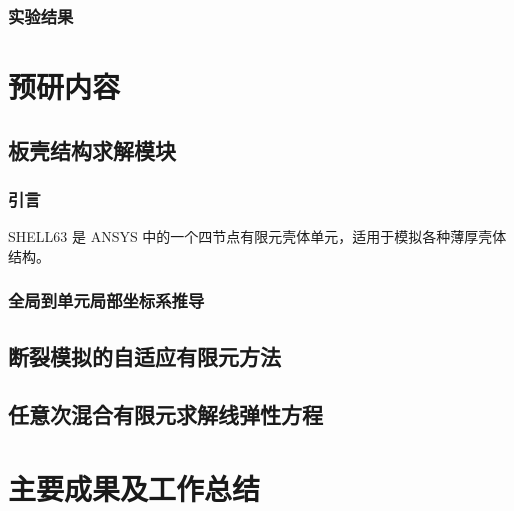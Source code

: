 \documentclass{article}
\begin{document}
\subsubsection{实验结果}


\section{预研内容}

\subsection{板壳结构求解模块}
\subsubsection{引言}
SHELL63 是 ANSYS 中的一个四节点有限元壳体单元，适用于模拟各种薄厚壳体结构。
\subsubsection{全局到单元局部坐标系推导}

\subsection{断裂模拟的自适应有限元方法}

\subsection{任意次混合有限元求解线弹性方程}

\section{主要成果及工作总结}





\end{document}
